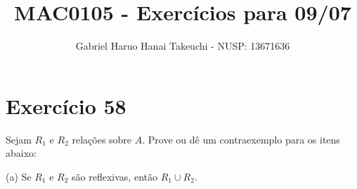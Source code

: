 \documentclass{article}
\author{Gabriel Haruo Hanai Takeuchi - NUSP: 13671636}
\title{MAC0105 - Exercícios para 09/07}
\date{}
\begin{document}
\maketitle

\section*{Exercício 58}

Sejam $R_1$ e $R_2$ relações sobre $A$. Prove ou dê um contraexemplo para os itens abaixo:

(a) Se $R_1$ e $R_2$ são reflexivas, então $R_1 \cup R_2$.
\end{document}
